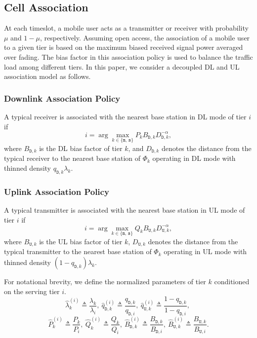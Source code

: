 \documentclass[twocolumn,english]{IEEEtran}
\theoremstyle{plain}
\theoremstyle{definition}
\begin{document}
\subsection{Cell Association}

At each timeslot, a mobile user acts as a transmitter or receiver
with probability $\mu$ and $1-\mu$, respectively. Assuming open
access, the association of a mobile user to a given tier is based
on the maximum biased received signal power averaged over fading.
The bias factor in this association policy is used to balance the
traffic load among different tiers. In this paper, we consider a decoupled
DL and UL association model as follows.


\subsubsection{Downlink Association Policy}

A typical receiver is associated with the nearest base station in
DL mode of tier\emph{ $i$ }if
\begin{equation}
i=\arg\underset{k\in\{\mathtt{m},\,\mathtt{s}\}}{\max}P_{k}B_{\mathtt{D},k}D_{\mathtt{D},k}^{-\alpha},\label{eq:Ass_tierI_DL}
\end{equation}
where $B_{\mathtt{D},k}$ is the DL bias factor of tier $k$, and
$D_{\mathtt{D},k}$ denotes the distance from the typical receiver
to the nearest base station of $\Phi_{k}$ operating in DL mode with
thinned density $q_{\mathtt{D},k}\lambda_{k}$.


\subsubsection{Uplink Association Policy}

A typical transmitter is associated with the nearest base station
in UL mode of tier $i$ if
\begin{equation}
i=\arg\underset{k\in\{\mathtt{m},\,\mathtt{s}\}}{\max}Q_{k}B_{\mathtt{U},k}D_{\mathtt{U},k}^{-\alpha},\label{eq:Ass_tierI_UL}
\end{equation}
where $B_{\mathtt{U},k}$ is the UL bias factor of tier $k$, $D_{\mathtt{U},k}$
denotes the distance from the typical transmitter to the nearest base
station of $\Phi_{k}$ operating in UL mode with thinned density $\left(1-q_{\mathtt{D},k}\right)\lambda_{k}$.

For notational brevity, we define the normalized parameters of tier
$k$ conditioned on the serving tier $i$.
\[
\hat{\lambda}_{k}^{(i)}\triangleq\frac{\lambda_{k}}{\lambda_{i}},\:\hat{q}_{\mathtt{D},k}^{(i)}\triangleq\frac{q_{\mathtt{D},k}}{q_{\mathtt{D},i}},\:\hat{q}_{\mathtt{U},k}^{(i)}\triangleq\frac{1-q_{\mathtt{D},k}}{1-q_{\mathtt{D},i}},\:
\]
\begin{equation}
\hat{P}_{k}^{(i)}\triangleq\frac{P_{k}}{P_{i}},\:\hat{Q}_{k}^{(i)}\triangleq\frac{Q_{k}}{Q_{i}},\:\hat{B}_{\mathtt{D},k}^{(i)}\triangleq\frac{B_{\mathtt{D},k}}{B_{\mathtt{D},i}},\:\hat{B}_{\mathtt{U},k}^{(i)}\triangleq\frac{B_{\mathtt{U},k}}{B_{\mathtt{U},i}}.
\end{equation}
\end{document}
